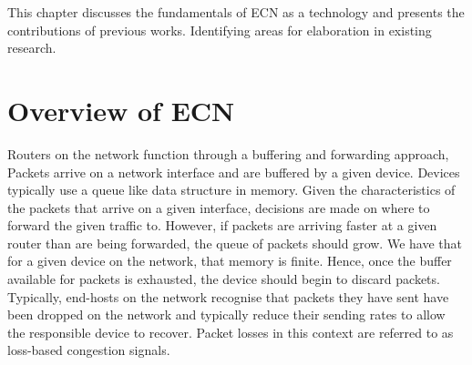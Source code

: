 \documentclass{l4proj}
\begin{document}
This chapter discusses the fundamentals of ECN as a technology and presents the contributions of previous works. Identifying areas for elaboration in existing research.

\section{Overview of ECN}



Routers on the network function through a buffering and forwarding approach, Packets arrive on a network interface and are buffered by a given device. Devices typically use a queue like data structure in memory. Given the characteristics of the packets that arrive on a given interface, decisions are made on where to forward the given traffic to. However, if packets are arriving faster at a given router than are being forwarded, the queue of packets should grow. We have that for a given device on the network, that memory is finite. Hence, once the buffer available for packets is exhausted, the device should begin to discard packets. Typically, end-hosts on the network recognise that packets they have sent have been dropped on the network and typically reduce their sending rates to allow the responsible device to recover. Packet losses in this context are referred to as loss-based congestion signals.
\end{document}
